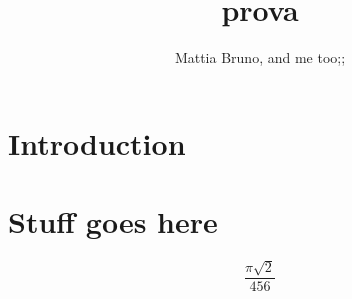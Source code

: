 \documentclass{article}
\title{prova}
\author{Mattia Bruno, and me too;;}
\date{today, \date,}
\begin{document}
\maketitle

\section{Introduction}

\section{Stuff goes here}    


\begin{equation}
    \frac{\pi \sqrt{2}}{456}
\end{equation}
\end{document}
